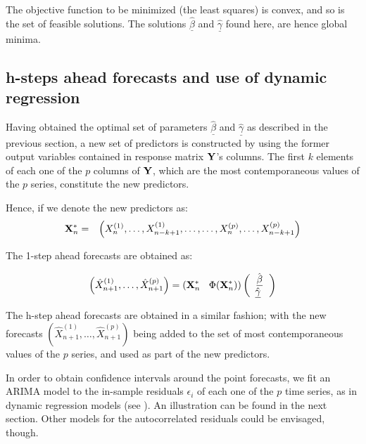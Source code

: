 The objective function to be minimized (the least squares) is convex, and so is the set of feasible solutions. The solutions ${\hat{\underline{\beta}}}$ and ${\hat{\underline{\gamma}}}$ found here, are hence global minima.

\subsection{h-steps ahead forecasts and use of dynamic regression}
\label{sec:preds}

Having obtained the optimal set of parameters
$\hat{\underline{\beta}}$ and $\hat{\underline{\gamma}}$ as described in the previous section,  a new set of predictors is constructed by using the former output variables contained in response matrix ${\bf Y}$'s columns. The first $k$ elements of each one of the $p$ columns of ${\bf Y}$, which are the most contemporaneous values of the $p$ series, constitute the new predictors.

\medskip

Hence, if we denote the new predictors as:
\begin{eqnarray}
{\bf X}^*_n &=& \left(X^{(1)}_n, \ldots, X^{(1)}_{n-k+1}, \ldots, \ldots, X^{(p)}_n, \ldots, X^{(p)}_{n-k+1}\right)
\end{eqnarray}

The 1-step ahead forecasts are obtained as:

$$
\left(\hat{X}_{n+1}^{(1)}, \ldots, \hat{X}_{n+1}^{(p)}\right) =
\left({\bf X}^*_n   \: \: \: \: \Phi({\bf X}^*_n)\right) \left( {\begin{array}{c} \hat{\underline{\beta}} \\       \hat{\underline{\gamma}} \      \end{array}
} \right)
$$

The h-step ahead forecasts are obtained in a similar fashion; with the new forecasts $\left(\hat{X}_{n+1}^{(1)}, \ldots, \hat{X}_{n+1}^{(p)}\right)$ being added to the set of most contemporaneous values of the $p$ series, and used as part of the new predictors.

\medskip

In order to obtain confidence intervals around the point forecasts, we fit an ARIMA model to the in-sample residuals $\epsilon_i$ of each one of the $p$ time series, as in dynamic regression models (see \cite{pankratz2012forecasting}). An illustration can be found in the next section. Other models for the autocorrelated residuals could be envisaged, though.

